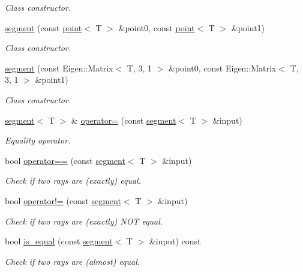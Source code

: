 \begin{DoxyCompactItemize}
\begin{DoxyCompactList}\small\item\em Class constructor. \end{DoxyCompactList}\item 
\hyperlink{classddd_1_1segment_afdfcc983efc30b3dee0af2603795775b}{segment} (const \hyperlink{classddd_1_1point}{point}$<$ T $>$ \&point0, const \hyperlink{classddd_1_1point}{point}$<$ T $>$ \&point1)
\begin{DoxyCompactList}\small\item\em Class constructor. \end{DoxyCompactList}\item 
\hyperlink{classddd_1_1segment_aa4e3b31e4400f99cbf459626518dab2f}{segment} (const Eigen\+::\+Matrix$<$ T, 3, 1 $>$ \&point0, const Eigen\+::\+Matrix$<$ T, 3, 1 $>$ \&point1)
\begin{DoxyCompactList}\small\item\em Class constructor. \end{DoxyCompactList}\item 
\hyperlink{classddd_1_1segment}{segment}$<$ T $>$ \& \hyperlink{classddd_1_1segment_a76da84441d5e0f8c2e69029b193de84c}{operator=} (const \hyperlink{classddd_1_1segment}{segment}$<$ T $>$ \&input)
\begin{DoxyCompactList}\small\item\em Equality operator. \end{DoxyCompactList}\item 
bool \hyperlink{classddd_1_1segment_ae4c9007a263679e0f0b06f3d75de9e97}{operator==} (const \hyperlink{classddd_1_1segment}{segment}$<$ T $>$ \&input)
\begin{DoxyCompactList}\small\item\em Check if two rays are (exactly) equal. \end{DoxyCompactList}\item 
bool \hyperlink{classddd_1_1segment_ab9517c79cc771551a50fb30e307e7807}{operator!=} (const \hyperlink{classddd_1_1segment}{segment}$<$ T $>$ \&input)
\begin{DoxyCompactList}\small\item\em Check if two rays are (exactly) N\+OT equal. \end{DoxyCompactList}\item 
bool \hyperlink{classddd_1_1segment_ae8acfec0892da591ad0dfcf583683275}{is\+\_\+equal} (const \hyperlink{classddd_1_1segment}{segment}$<$ T $>$ \&input) const
\begin{DoxyCompactList}\small\item\em Check if two rays are (almost) equal. \end{DoxyCompactList}\item 

\end{DoxyCompactItemize}
